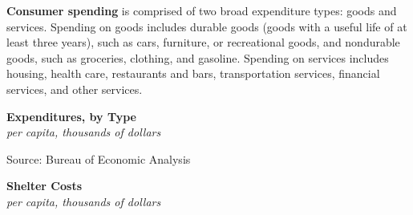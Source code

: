 \documentclass{report}
\makeatletter
\newcommand{\tbllink}[1]{\href{https://raw.githubusercontent.com/bdecon/US-chartbook/master/chartbook/data/#1}{\faTable}}
\newcommand*\short[1]{\expandafter\@gobbletwo\number\numexpr#1\relax}
\newcommand{\stdnode}[3]{\node[below, align=left, shift=({#1,#2})]{#3};}
\newcommand{\shdateaxisticks}{
		date coordinates in=x, axis line style={draw=none},
		xmax={2023-11-30},
		max space between ticks=40,	    
		xtick={{1990-01-01}, {1995-01-01}, {2000-01-01}, 
			{2005-01-01}, {2010-01-01}, {2015-01-01}, {2020-01-01}},
		minor xtick={},
		enlarge y limits={0.06}, enlarge x limits={0.01},
		xticklabel style={align=center, yshift=-2pt}, tick label style={inner sep=0pt},
		}
\newcommand{\bbar}[2]{extra #1 ticks = {{#2}}, extra #1 tick labels = ,
		extra #1 tick style = {grid=major, grid style={thick, black!25}},}
\newcommand{\stdline}[4]{\addplot[very thick, no markers, color=#1] 
		table [x=#2, y=#3, col sep=comma] {#4};	}
\newcommand{\rbars}{
		\fill[color=black!10] (axis cs:{1990-07-01},\pgfkeysvalueof{/pgfplots/ymin}) rectangle 
			(axis cs:{1991-03-01}, \pgfkeysvalueof{/pgfplots/ymax});
		\fill[color=black!10] (axis cs:{2007-12-01},\pgfkeysvalueof{/pgfplots/ymin}) rectangle 
			(axis cs:{2009-07-01}, \pgfkeysvalueof{/pgfplots/ymax});
		\fill[color=black!10] (axis cs:{2001-03-01},\pgfkeysvalueof{/pgfplots/ymin}) rectangle 
			(axis cs:{2001-11-01}, \pgfkeysvalueof{/pgfplots/ymax});
		\fill[color=black!10] (axis cs:{2020-02-01},\pgfkeysvalueof{/pgfplots/ymin}) rectangle 
			(axis cs:{2020-05-01}, \pgfkeysvalueof{/pgfplots/ymax});}
\makeatother
\begin{document}
{\begin{minipage}{0.76\textwidth}
\small \textbf{Consumer spending} is comprised of two broad expenditure types: goods and services. Spending on goods includes durable goods (goods with a useful life of at least three years), such as cars, furniture, or recreational goods, and nondurable goods, such as groceries, clothing, and gasoline. Spending on services includes housing, health care, restaurants and bars, transportation services, financial services, and other services. 
\end{minipage}

\begin{minipage}{0.38\textwidth}
\normalsize \textbf{Expenditures, by Type}\\
\footnotesize{\textit{per capita, thousands of dollars}}
\vspace{3.1cm}

\hspace{3mm} 

\footnotesize{Source: Bureau of Economic Analysis} \hspace{10mm} \tbllink{pce_levels.csv}
\end{minipage} \hspace{6mm}
\begin{minipage}{0.33\textwidth}
\small 
\end{minipage}
\vspace{1mm}

\begin{minipage}{0.38\textwidth}
\normalsize \textbf{Shelter Costs}\\
\footnotesize{\textit{per capita, thousands of dollars}}
\vspace{3.1cm}


\end{minipage}}
\end{document}
